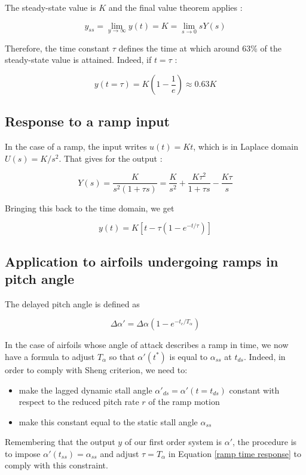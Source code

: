 \noindent The steady-state value is $K$ and the final value theorem applies : 

\begin{equation}
y_{ss} = \lim_{y \rightarrow \infty} y(t) = K = \lim_{s \rightarrow 0} sY(s)
\end{equation}

Therefore, the time constant $\tau$ defines the time at which around 63\% of the steady-state value is attained. Indeed, if $t=\tau$ : 

\begin{equation}
y(t=\tau) = K(1-\frac{1}{e}) \approx 0.63K 
\end{equation}

\subsection{Response to a ramp input}

In the case of a ramp, the input writes $u(t) = Kt$, which is in Laplace domain $U(s) = K/s^2$. That gives for the output : 

\begin{equation}
Y(s) = \frac{K}{s^2(1+\tau s)} = \frac{K}{s^2} + \frac{K \tau^2}{1+\tau s} - \frac{K \tau}{s}
\end{equation}

Bringing this back to the time domain, we get 

\begin{equation}
y(t) = K \left[ t - \tau(1-e^{-t/\tau})\right]
\label{ramp time response}
\end{equation}

\subsection{Application to airfoils undergoing ramps in pitch angle}

The delayed pitch angle is defined as 

\begin{equation}
\Delta \alpha' = \Delta \alpha (1-e^{-t_c/T_\alpha})
\end{equation}

In the case of airfoils whose angle of attack describes a ramp in time, we now have a formula to adjust $T_\alpha$ so that $\alpha'(t^*)$ is equal to $\alpha_{ss}$ at $t_{ds}$. Indeed, in order to comply with Sheng criterion, we need to:

\begin{itemize}
\item make the lagged dynamic stall angle $\alpha'_{ds} = \alpha'(t=t_{ds})$ constant with respect to the reduced pitch rate $r$ of the ramp motion
\item make this constant equal to the static stall angle $\alpha_{ss}$
\end{itemize}


\noindent Remembering that the output $y$ of our first order system is $\alpha'$, the procedure is to impose $\alpha'(t_{ss}) = \alpha_{ss}$ and adjust $\tau = T_\alpha$ in Equation \eqref{ramp time response} to comply with this constraint.